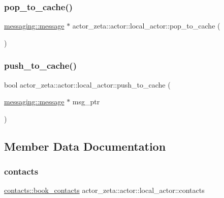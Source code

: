 \subsubsection{\texorpdfstring{pop\+\_\+to\+\_\+cache()}{pop\_to\_cache()}}
{\footnotesize\ttfamily \hyperlink{classactor__zeta_1_1messaging_1_1message}{messaging\+::message} $\ast$ actor\+\_\+zeta\+::actor\+::local\+\_\+actor\+::pop\+\_\+to\+\_\+cache (\begin{DoxyParamCaption}{ }\end{DoxyParamCaption})\hspace{0.3cm}{\ttfamily [protected]}}

\mbox{\label{classactor__zeta_1_1actor_1_1local__actor_ae736971463581933ea4daa4958f3cd80}} 
\subsubsection{\texorpdfstring{push\+\_\+to\+\_\+cache()}{push\_to\_cache()}}
{\footnotesize\ttfamily bool actor\+\_\+zeta\+::actor\+::local\+\_\+actor\+::push\+\_\+to\+\_\+cache (\begin{DoxyParamCaption}\item[{\hyperlink{classactor__zeta_1_1messaging_1_1message}{messaging\+::message} $\ast$}]{msg\+\_\+ptr }\end{DoxyParamCaption})\hspace{0.3cm}{\ttfamily [protected]}}



\subsection{Member Data Documentation}
\mbox{\label{classactor__zeta_1_1actor_1_1local__actor_a4fda781631b136f3ed0adcea9fa69cc4}} 
\subsubsection{\texorpdfstring{contacts}{contacts}}
{\footnotesize\ttfamily \hyperlink{classactor__zeta_1_1contacts_1_1book__contacts}{contacts\+::book\+\_\+contacts} actor\+\_\+zeta\+::actor\+::local\+\_\+actor\+::contacts\hspace{0.3cm}{\ttfamily [protected]}}

